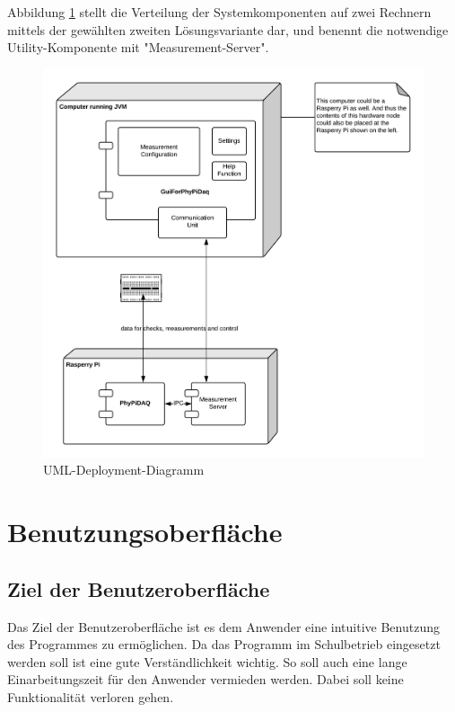 \documentclass[parskip=full]{scrartcl}
\begin{document}
Abbildung \ref{DeploymentDiagram} stellt die Verteilung der Systemkomponenten auf zwei Rechnern mittels der gewählten zweiten Lösungsvariante dar, und benennt die notwendige Utility-Komponente mit "Measurement-Server". 
 

\begin{figure}[h]
	\begin{center}
		\includegraphics[width = 12cm]{Grafik/DeploymentDiagram.png}
		\caption{UML-Deployment-Diagramm}
		\label{DeploymentDiagram}
	\end{center}
\end{figure}

\section{Benutzungsoberfläche}

\subsection{Ziel der Benutzeroberfläche}

Das Ziel der Benutzeroberfläche ist es dem Anwender eine intuitive Benutzung des Programmes zu ermöglichen. Da das Programm im Schulbetrieb eingesetzt werden soll ist eine gute Verständlichkeit wichtig. So soll auch eine lange Einarbeitungszeit für den Anwender vermieden werden. Dabei soll keine Funktionalität verloren gehen.
\end{document}
